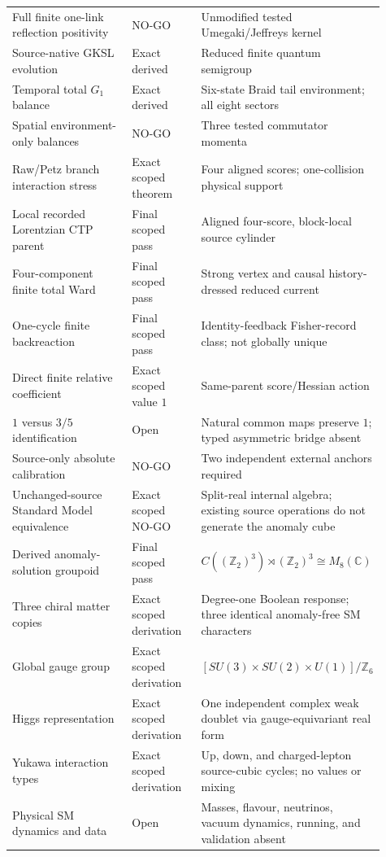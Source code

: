 \documentclass[11pt]{article}
\theoremstyle{definition}
\theoremstyle{remark}
\begin{document}
\begin{longtable}{>{\raggedright\arraybackslash}p{0.34\linewidth} >{\raggedright\arraybackslash}p{0.19\linewidth} >{\raggedright\arraybackslash}p{0.38\linewidth}}
Full finite one-link reflection positivity & NO-GO & Unmodified tested Umegaki/Jeffreys kernel \\
Source-native GKSL evolution & Exact derived & Reduced finite quantum semigroup \\
Temporal total $G_1$ balance & Exact derived & Six-state Braid tail environment; all eight sectors \\
Spatial environment-only balances & NO-GO & Three tested commutator momenta \\
Raw/Petz branch interaction stress & Exact scoped theorem & Four aligned scores; one-collision physical support \\
Local recorded Lorentzian CTP parent & Final scoped pass & Aligned four-score, block-local source cylinder \\
Four-component finite total Ward & Final scoped pass & Strong vertex and causal history-dressed reduced current \\
One-cycle finite backreaction & Final scoped pass & Identity-feedback Fisher-record class; not globally unique \\
Direct finite relative coefficient & Exact scoped value $1$ & Same-parent score/Hessian action \\
$1$ versus $3/5$ identification & Open & Natural common maps preserve $1$; typed asymmetric bridge absent \\
Source-only absolute calibration & NO-GO & Two independent external anchors required \\
Unchanged-source Standard Model equivalence & Exact scoped NO-GO & Split-real internal algebra; existing source operations do not generate the anomaly cube \\
Derived anomaly-solution groupoid & Final scoped pass & $C((\mathbb Z_2)^3)\rtimes(\mathbb Z_2)^3\cong M_8(\mathbb C)$ \\
Three chiral matter copies & Exact scoped derivation & Degree-one Boolean response; three identical anomaly-free SM characters \\
Global gauge group & Exact scoped derivation & $[SU(3)\times SU(2)\times U(1)]/\mathbb Z_6$ \\
Higgs representation & Exact scoped derivation & One independent complex weak doublet via gauge-equivariant real form \\
Yukawa interaction types & Exact scoped derivation & Up, down, and charged-lepton source-cubic cycles; no values or mixing \\
Physical SM dynamics and data & Open & Masses, flavour, neutrinos, vacuum dynamics, running, and validation absent \\

\end{longtable}
\end{document}
